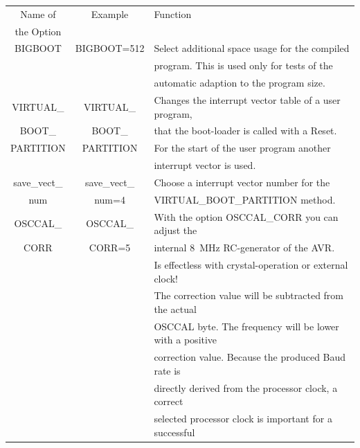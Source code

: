 \begin{table}[H]
  \begin{center}
    \begin{tabular}{| c | c | l |}
    \hline
   Name of        & Example        & Function                                            \\
   the Option     &                &                                                     \\
    \hline
    \hline
 BIGBOOT           & BIGBOOT=512    & Select additional space usage for the compiled \\
                   &                & program. This is used only for tests of the \\
                   &                & automatic adaption to the program size. \\
    \hline
VIRTUAL\_          & VIRTUAL\_       & Changes the interrupt vector table of a user program, \\
 BOOT\_            & BOOT\_          & that the boot-loader is called with a Reset. \\
 PARTITION         & PARTITION       & For the start of the user program another \\
		   &                 & interrupt vector is used.          \\
    \hline
 save\_vect\_      & save\_vect\_    & Choose a interrupt vector number for the  \\
      num          &    num=4        & VIRTUAL\_BOOT\_PARTITION method.        \\
    \hline
 OSCCAL\_          & OSCCAL\_       & With the option OSCCAL\_CORR you can adjust the \\
 CORR              & CORR=5         & internal 8~MHz RC-generator of the AVR. \\
                   &                & Is effectless with crystal-operation or external clock! \\
                   &                & The correction value will be subtracted from the actual \\
                   &                & OSCCAL byte. The frequency will be lower with a positive \\
                   &                & correction value. Because the produced Baud rate is \\
                   &                & directly derived from the processor clock, a correct \\
                   &                & selected processor clock is important for a successful \\

\end{tabular}
\end{center}
\end{table}
